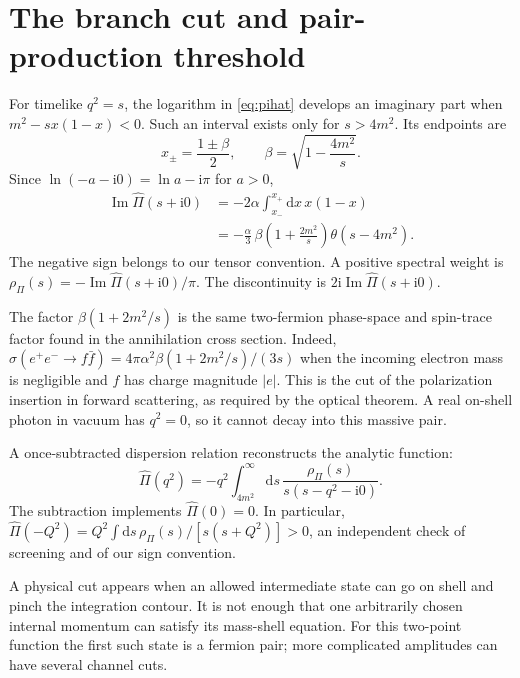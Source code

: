 \documentclass[11pt]{article}
\newcommand{\dd}{\mathrm d}
\newcommand{\ii}{\mathrm i}
\newcommand{\module}[1]{\clearpage\section{#1}}
\begin{document}
\module{The branch cut and pair-production threshold}
For timelike \(q^2=s\), the logarithm in \eqref{eq:pihat} develops an
imaginary part when \(m^2-sx(1-x)<0\). Such an interval exists only for
\(s>4m^2\). Its endpoints are
\begin{equation}
 x_\pm=\frac{1\pm\beta}{2},\qquad
 \beta=\sqrt{1-\frac{4m^2}{s}}.
\end{equation}
Since \(\ln(-a-\ii0)=\ln a-\ii\pi\) for \(a>0\),
\begin{align}
 \operatorname{Im}\widehat\Pi(s+\ii0)
 &=-2\alpha\int_{x_-}^{x_+}\dd x\,x(1-x)\\
 &=-\frac{\alpha}{3}\,
 \beta\left(1+\frac{2m^2}{s}\right)\theta(s-4m^2).
 \label{eq:impi}
\end{align}
The negative sign belongs to our tensor convention. A positive spectral
weight is \(\rho_\Pi(s)=-\operatorname{Im}\widehat\Pi(s+\ii0)/\pi\).
The discontinuity is \(2\ii\operatorname{Im}\widehat\Pi(s+\ii0)\).

The factor \(\beta(1+2m^2/s)\) is the same two-fermion phase-space and
spin-trace factor found in the annihilation cross section. Indeed,
\(\sigma(e^+e^-\to f\bar f)=4\pi\alpha^2\beta(1+2m^2/s)/(3s)\)
when the incoming electron mass is negligible and \(f\) has charge
magnitude \(|e|\). This is the cut of the polarization insertion in
forward scattering, as required by the optical theorem. A real on-shell
photon in vacuum has \(q^2=0\), so it cannot decay into this massive pair.

A once-subtracted dispersion relation reconstructs the analytic function:
\begin{equation}
 \widehat\Pi(q^2)
 =-q^2\int_{4m^2}^\infty\dd s\,
 \frac{\rho_\Pi(s)}{s(s-q^2-\ii0)}.
 \label{eq:dispersion}
\end{equation}
The subtraction implements \(\widehat\Pi(0)=0\). In particular,
\(\widehat\Pi(-Q^2)=Q^2\int\dd s\,\rho_\Pi(s)/[s(s+Q^2)]>0\),
an independent check of screening and of our sign convention.

\begin{remarkbox}
A physical cut appears when an allowed intermediate state can go on
shell and pinch the integration contour. It is not enough that one
arbitrarily chosen internal momentum can satisfy its mass-shell equation.
For this two-point function the first such state is a fermion pair;
more complicated amplitudes can have several channel cuts.
\end{remarkbox}
\end{document}
